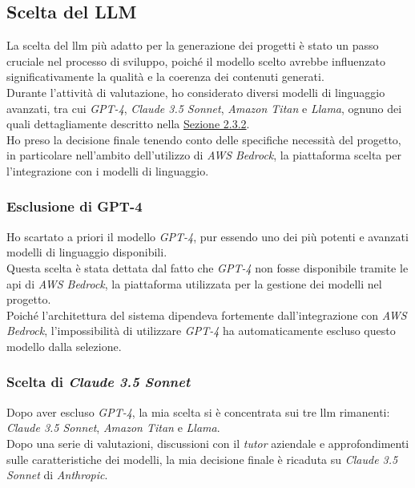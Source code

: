 \subsection{Scelta del LLM}
\label{subsec:scelta-llm}

La scelta del \gls{llm} più adatto per la generazione dei progetti è stato un passo cruciale nel processo di sviluppo, poiché il modello scelto avrebbe influenzato significativamente la qualità e la coerenza dei contenuti generati.\\
Durante l'attività di valutazione, ho considerato diversi modelli di linguaggio avanzati, tra cui \textit{GPT-4}, \textit{Claude 3.5 Sonnet}, \textit{Amazon Titan} e \textit{Llama}, ognuno dei quali dettagliamente descritto nella {\hyperref[subsec:llm-confronto]{Sezione 2.3.2}}.\\

\noindent Ho preso la decisione finale tenendo conto delle specifiche necessità del progetto, in particolare nell'ambito dell'utilizzo di \textit{AWS Bedrock}, la piattaforma scelta per l'integrazione con i modelli di linguaggio.

\subsubsection{Esclusione di GPT-4}

Ho scartato a priori il modello \textit{GPT-4}, pur essendo uno dei più potenti e avanzati modelli di linguaggio disponibili.\\
Questa scelta è stata dettata dal fatto che \textit{GPT-4} non fosse disponibile tramite le \gls{api} di \textit{AWS Bedrock}, la piattaforma utilizzata per la gestione dei modelli nel progetto.\\
Poiché l'architettura del sistema dipendeva fortemente dall'integrazione con \textit{AWS Bedrock}, l'impossibilità di utilizzare \textit{GPT-4} ha automaticamente escluso questo modello dalla selezione.

\subsubsection{Scelta di \textit{Claude 3.5 Sonnet}}

Dopo aver escluso \textit{GPT-4}, la mia scelta si è concentrata sui tre \gls{llm} rimanenti: \textit{Claude 3.5 Sonnet}, \textit{Amazon Titan} e \textit{Llama}. \\
Dopo una serie di valutazioni, discussioni con il \textit{tutor} aziendale e approfondimenti sulle caratteristiche dei modelli, la mia decisione finale è ricaduta su \textit{Claude 3.5 Sonnet} di \textit{Anthropic}.\\

